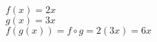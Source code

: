 \documentclass[varwidth,convert={density=2000,size=2000x,outext=.png}]{standalone}
\begin{document}
$f(x)=2x$\\
$g(x)=3x$\\
$f(g(x))=f\circ g=2(3x)=6x$
\end{document}
